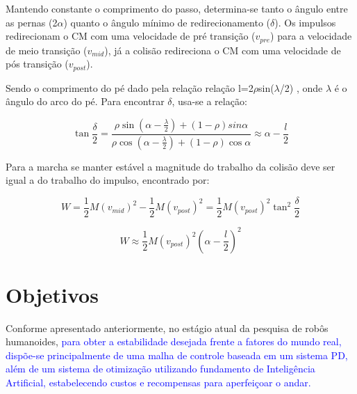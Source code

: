 Mantendo constante o comprimento do  passo, determina-se tanto o ângulo entre as pernas (2$\alpha$) quanto o ângulo mínimo  de redirecionamento ($\delta$). Os impulsos redirecionam o CM com uma  velocidade de pré transição ($ v_{pre}$) para a velocidade de meio transição ($v_{mid}$), já a colisão redireciona o CM com uma velocidade de pós transição ($v_{post}$). 

Sendo o comprimento do pé dado pela relação relação l=2$\rho$sin($\lambda$/2) , onde $\lambda$ é o ângulo do arco do pé. Para encontrar  $\delta$, usa-se a relação:

\begin{equation}
\tan\frac{\delta }{2}=\frac{\rho\sin (\alpha-\frac{\lambda}{2})+(1-\rho)sin\alpha}{\rho\cos (\alpha-\frac{\lambda}{2})+(1-\rho)\cos\alpha }\approx\alpha-\frac{l}{2}
\end{equation}

Para a marcha se manter estável a magnitude do trabalho da colisão deve ser igual a do trabalho do impulso, encontrado por:

\begin{equation}
W=\frac{1}{2}M(v_{mid})^2-\frac{1}{2}M(v_{post})^2=\frac{1}{2}M(v_{post})^2\tan^2\frac{\delta}{2}
\end{equation}


\begin{equation}
W\approx\frac{1}{2}M(v_{post})^2(\alpha-\frac{l}{2})^2
\end{equation}





\newpage

\section{Objetivos}

Conforme apresentado anteriormente, no estágio atual da pesquisa de robôs humanoides, \textcolor{blue}{para obter a estabilidade desejada frente a fatores do mundo real, dispõe-se principalmente de uma malha de controle baseada em um sistema PD, além de um sistema de otimização utilizando fundamento de Inteligência Artificial, estabelecendo custos e recompensas para aperfeiçoar o andar.}

